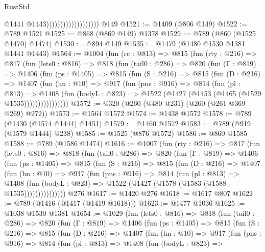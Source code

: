 \begin{lexlean}{RustStd}
\begin{coremodule}
{\begin{coremodule}
{{{{{{{                                          @1441
                                          @1443)))))))))))))))))))
    @149
@1521 := @1409 (@806 @149)
@1522 := @789 @1521
@1525 := @868 (@869 @149) @1378
@1529 := @789 (@860 (@1525 @1470) @1474)
@1530 := @894 @149
@1535 := @1479 (@1480 @1530 @1381 @1441 @1443)
@1564 := @1004
    (fun (rc : @813) =>
    @815
      (fun (rty : @216) =>
      @817
        (fun (lets0 : @816) =>
        @818
          (fun (tail0 : @286) =>
          @820
            (fun (Γ : @819) =>
            @1406
              (fun (ps : @1405) =>
              @815
                (fun (S : @216) =>
                @815
                  (fun (D : @216) =>
                  @1407
                    (fun (hn : @10) =>
                    @917
                      (fun (pns : @916) =>
                      @814
                        (fun (pl : @813) =>
                        @1408
                          (fun (bodyL : @823) =>
                          @1522 (@1427 (@1453 (@1465 (@1529 @1535))))))))))))))))
@1572 := @320 (@260 (@480 @231) (@260 (@261 @369 @269) @272))
@1573 := @1564 @1572
@1574 := @1438 @1572
@1578 := @789 (@1430 (@1574 @1444) @1451)
@1579 := @1460 @1572
@1583 := @789 (@919 (@1579 @1444) @238)
@1585 := @1525 (@876 @1572)
@1586 := @860 @1585
@1588 := @789 (@1586 @1474)
@1616 := @1007
    (fun (rty : @216) =>
    @817
      (fun (lets0 : @816) =>
      @818
        (fun (tail0 : @286) =>
        @820
          (fun (Γ : @819) =>
          @1406
            (fun (ps : @1405) =>
            @815
              (fun (S : @216) =>
              @815
                (fun (D : @216) =>
                @1407
                  (fun (hn : @10) =>
                  @917
                    (fun (pns : @916) =>
                    @814
                      (fun (pl : @813) =>
                      @1408
                        (fun (bodyL : @823) =>
                        @1522 (@1427 (@1578 (@1583 (@1588 @1535)))))))))))))))
    @276
@1617 := @1420 @276
@1618 := @1617 @807
@1622 := @789 (@1416 (@1417 (@1419 @1618)))
@1623 := @1477 @1036
@1625 := @1038 @1530 @1381
@1654 := @1029
    (fun (lets0 : @816) =>
    @818
      (fun (tail0 : @286) =>
      @820
        (fun (Γ : @819) =>
        @1406
          (fun (ps : @1405) =>
          @815
            (fun (S : @216) =>
            @815
              (fun (D : @216) =>
              @1407
                (fun (hn : @10) =>
                @917
                  (fun (pns : @916) =>
                  @814
                    (fun (pl : @813) =>
                    @1408
                      (fun (bodyL : @823) =>
}}}}}}}
\end{coremodule}}
\end{coremodule}
\end{lexlean}
